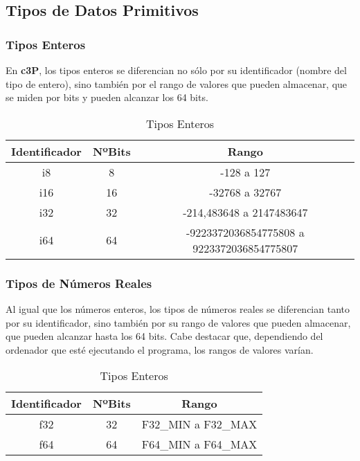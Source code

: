 \subsection{Tipos de Datos Primitivos}
\subsubsection{Tipos Enteros}

En \textbf{c3P}, los tipos enteros se diferencian no sólo por su identificador (nombre del
tipo de entero), sino también por el rango de valores que pueden almacenar, que se miden
por bits y pueden alcanzar los 64 bits.

\begin{table}[H]
    \centering
    \begin{tabular}{|c|c|c|}
         \hline
         \textbf{Identificador} & \textbf{NºBits} & \textbf{Rango} \\
         \hline
         i8 & 8 & -128 a 127 \\
         \hline
         i16 & 16 & -32768 a 32767 \\
         \hline
         i32 & 32 & -214,483648 a 2147483647 \\
         \hline
         i64 & 64 & -9223372036854775808 a 9223372036854775807 \\
         \hline
    \end{tabular}
    \caption{Tipos Enteros}
    \label{tab:tab_tipos_enteros}
\end{table}

\subsubsection{Tipos de Números Reales}

Al igual que los números enteros, los tipos de números reales se diferencian tanto
por su identificador, sino también por su rango de valores que pueden almacenar,
que pueden alcanzar hasta los 64 bits. Cabe destacar que, dependiendo del ordenador
que esté ejecutando el programa, los rangos de valores varían.

\begin{table}[H]
    \centering
    \begin{tabular}{|c|c|c|}
         \hline
         \textbf{Identificador} & \textbf{NºBits} & \textbf{Rango} \\
         \hline
         f32 & 32 & F32\_MIN a F32\_MAX \\
         \hline
         f64 & 64 & F64\_MIN a F64\_MAX \\
         \hline
    \end{tabular}
    \caption{Tipos Enteros}
    \label{tab:tab_tipos_decimales}
\end{table}


